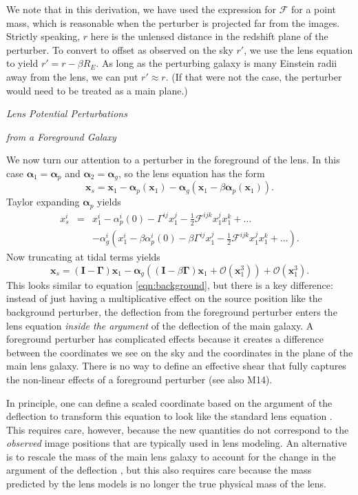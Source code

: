 \documentclass{emulateapj}
\newcommand\I[0]{\mathbf{I}}
\newcommand\GammaMat[0]{\boldsymbol{\Gamma}}
\newcommand\x[0]{\mathbf{x}}
\newcommand\al[0]{\boldsymbol{\alpha}}
\newcommand\sF{{\mathcal F}}
\begin{document}
We note that in this derivation, we have used the expression for $\sF$ for a point mass, which is reasonable when the perturber is projected far from the images.  Strictly speaking, $r$ here is the unlensed distance in the redshift plane of the perturber. To convert to offset as observed on the sky $r'$, we use the lens equation to yield $r' = r - \beta R_E$. As long as the perturbing galaxy is many Einstein radii away from the lens, we can put $r' \approx r$.  (If that were not the case, the perturber would need to be treated as a main plane.)

\medskip
\centerline{\emph{Lens Potential Perturbations}}
\centerline{\emph{from a Foreground Galaxy}}
\medskip



We now turn our attention to a perturber in the foreground of the lens. In this case $\al_1 = \al_p$ and $\al_2 = \al_g$, so the lens equation has the form
\begin{equation}
\x_s =\x_1 - \al_p(\x_1) - \al_g(\x_1 - \beta \al_p(\x_1)).
\end{equation}
Taylor expanding $\al_p$ yields
\begin{eqnarray}
x^i_s &=& x^i_1  - \alpha_p^i(0) - \Gamma^{ij}x^j_1 - \frac{1}{2} \sF^{ijk} x^j_1 x^k_1 +\ldots \\
&& - \alpha^i_g \left(x^i_1 - \beta\alpha_p^i(0) - \beta \Gamma^{ij} x^j_1 - \frac{1}{2} \sF^{ijk} x^j_1 x^k_1 + \ldots \right). \nonumber
\end{eqnarray}
Now truncating at tidal terms yields
\begin{equation}
\x_s = (\I - \GammaMat) \x_1 - \al_g\left((\I - \beta\GammaMat) \x_1 + \mathcal{O}(\x_1^3)\right) + \mathcal{O}(\x_1^3).
\end{equation}
This looks similar to equation \ref{eqn:background}, but there is a key difference: instead of just having a multiplicative effect on the source position like the background perturber, the deflection from the foreground perturber enters the lens equation \emph{inside the argument} of the deflection of the main galaxy. A foreground perturber has complicated effects because it creates a difference between the coordinates we see on the sky and the coordinates in the plane of the main lens galaxy. There is no way to define an effective shear that fully captures the non-linear effects of a foreground perturber (see also M14).

In principle, one can define a scaled coordinate based on the argument of the deflection to transform this equation to look like the standard lens equation \citep[e.g.,][]{Schneider97,Keeton03}. This requires care, however, because the new quantities do not correspond to the \emph{observed} image positions that are typically used in lens modeling. An alternative is to rescale the mass of the main lens galaxy to account for the change in the argument of the deflection \citep{Schneider97}, but this also requires care because the mass predicted by the lens models is no longer the true physical mass of the lens. 
\end{document}
